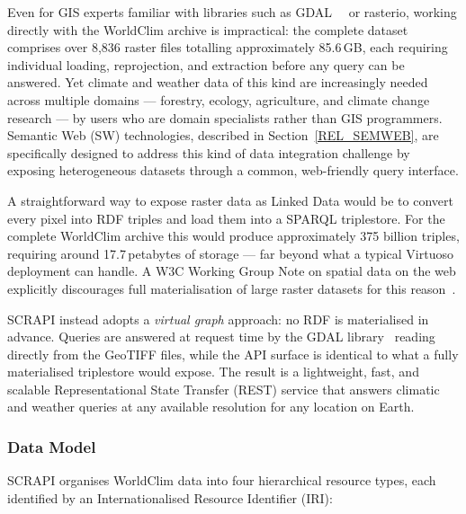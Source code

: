Even for GIS experts familiar with libraries such as
GDAL~\cite{gdal}~\cite{rasterio} or rasterio, working directly with the
WorldClim archive is impractical: the complete dataset comprises over 8{,}836
raster files totalling approximately 85.6\,GB, each requiring individual
loading, reprojection, and extraction before any query can be answered. Yet
climate and weather data of this kind are increasingly needed across multiple
domains --- forestry, ecology, agriculture, and climate change research ---
by users who are domain specialists rather than GIS programmers. Semantic Web
(SW) technologies, described in Section~\ref{REL_SEMWEB}, are specifically
designed to address this kind of data integration challenge by exposing
heterogeneous datasets through a common, web-friendly query interface.

A straightforward way to expose raster data as Linked Data would be to convert
every pixel into RDF triples and load them into a SPARQL triplestore. For the
complete WorldClim archive this would produce approximately 375 billion triples,
requiring around 17.7\,petabytes of storage --- far beyond what a typical
Virtuoso deployment can handle. A W3C Working Group Note on spatial data on the
web explicitly discourages full materialisation of large raster datasets for
this reason~\cite{w3c_spatial}.

SCRAPI instead adopts a \emph{virtual graph} approach: no RDF is materialised
in advance. Queries are answered at request time by the GDAL
library~\cite{gdal} reading directly from the GeoTIFF files, while the API
surface is identical to what a fully materialised triplestore would expose.
The result is a lightweight, fast, and scalable Representational State Transfer
(REST) service that answers climatic and weather queries at any available
resolution for any location on Earth.

\subsubsection{Data Model}\label{REL_WORLDCLIM_API_MODEL}

SCRAPI organises WorldClim data into four hierarchical resource types, each
identified by an Internationalised Resource Identifier (IRI):

